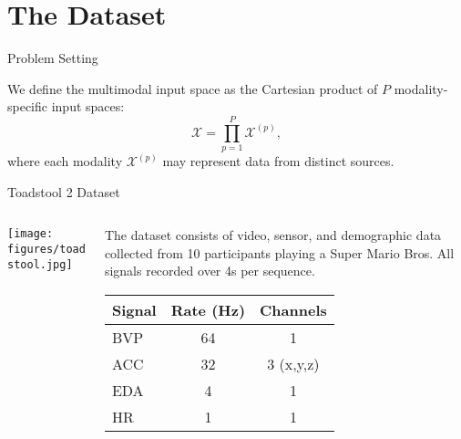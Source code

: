 \section{The Dataset}

\begin{frame}{Problem Setting}
	\begin{block}{}
		We define the multimodal input space as the Cartesian product of $P$ modality-specific input spaces:
		\[
		\mathcal{X} = \prod_{p=1}^{P} \mathcal{X}^{(p)},
		\]
		where each modality $\mathcal{X}^{(p)}$ may represent data from distinct sources.
	\end{block}
	
\end{frame}



\begin{frame}{Toadstool 2 Dataset}
		\begin{columns}[T] %
		\begin{column}{0.4\textwidth}
			\texttt{[image: figures/toadstool.jpg]}
			
		\end{column}
		\begin{column}{0.6\textwidth}
			\begin{block}{}
				The dataset consists of video, sensor, and demographic data collected from 10 participants playing a Super Mario Bros. All signals recorded over 4s per sequence.
			\end{block}

		\vspace{0.5em}
		\centering
		\begin{tabular}{lcc}
		\toprule
		\textbf{Signal} & \textbf{Rate (Hz)} & \textbf{Channels} \\
		\midrule
		BVP  & 64 & 1      \\
		ACC  & 32 & 3 (x,y,z) \\
		EDA  & 4  & 1      \\
		HR   & 1  & 1      \\
		\bottomrule
		\end{tabular}


		\end{column}
	\end{columns}
\end{frame}


